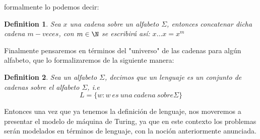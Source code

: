 \documentclass[10pt]{report}
\newtheorem{definition}{Definition}
\begin{document}
    formalmente lo podemos decir:\newline
    \begin{definition}
        Sea $x$ una cadena sobre un alfabeto $\Sigma$, entonces concatenar dicha cadena
        $m-veces$, con $m\in\N$ se escribirá así:\newline
        $x\dots x = x^m$
    \end{definition}
    Finalmente pensaremos en términos del "universo" de las cadenas para algún alfabeto, que lo formalizaremos de la
    siguiente manera:
    \begin{definition}
        Sea un alfabeto $\Sigma$, decimos que un lenguaje es un conjunto de cadenas sobre el alfabeto $\Sigma$, i.e
        \begin{equation}
            \label{eq:equation7}
             L = \{w : w\ es \ una \ cadena\ sobre \Sigma \}
        \end{equation}
    \end{definition}
    Entonces una vez que ya tenemos la definición de lenguaje, nos moveremos a presentar el modelo de máquina de Turing,
    ya que en este contexto los problemas serán modelados en términos de lenguaje, con la noción anteriormente anunciada.
\end{document}
